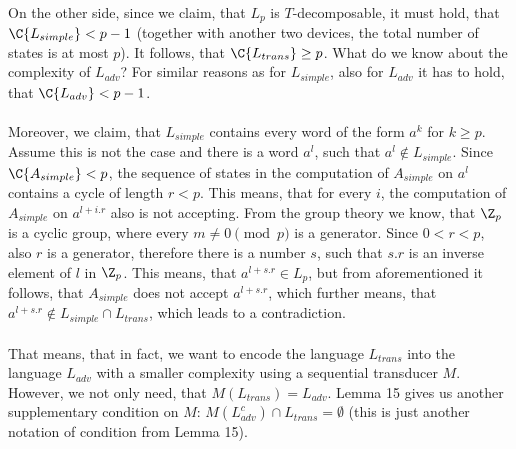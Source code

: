 \paragraph{}
On the other side, since we claim, that $L_p$ is $T$-decomposable, it must hold, that $\C{L_{simple}} \allowbreak < p-1$ (together with another two devices, the total number of states is at most $p$). It follows, that $\C{L_{trans}} \geq p$. What do we know about the complexity of $L_{adv}$? For similar reasons as for $L_{simple}$, also for $L_{adv}$ it has to hold, that $\C{L_{adv}} < p-1$.

\paragraph{}
Moreover, we claim, that $L_{simple}$ contains every word of the form $a^k$ for $k \geq p$. Assume this is not the case and there is a word $a^l$, such that $a^l \notin L_{simple}$. Since $\C{A_{simple}} < p$, the sequence of states in the computation of $A_{simple}$ on $a^l$ contains a cycle of length $r < p$. This means, that for every $i$, the computation of $A_{simple}$ on $a^{l+i.r}$ also is not accepting. From the group theory we know, that $\Z_p$ is a cyclic group, where every $m \neq 0 \pmod{p}$ is a generator. Since $0 < r < p$, also $r$ is a generator, therefore there is a number $s$, such that $s.r$ is an inverse element of $l$ in $\Z_p$. This means, that $a^{l+s.r} \in L_p$, but from aforementioned it follows, that $A_{simple}$ does not accept $a^{l+s.r}$, which further means, that $a^{l+s.r} \notin L_{simple} \cap L_{trans}$, which leads to a contradiction.

\paragraph{}
That means, that in fact, we want to encode the language $L_{trans}$ into the language $L_{adv}$ with a smaller complexity using a sequential transducer $M$. However, we not only need, that $M(L_{trans}) = L_{adv}$. Lemma 15 gives us another supplementary condition on $M$: $M(L^c_{adv}) \cap L_{trans} = \emptyset$ (this is just another notation of condition from Lemma 15).

